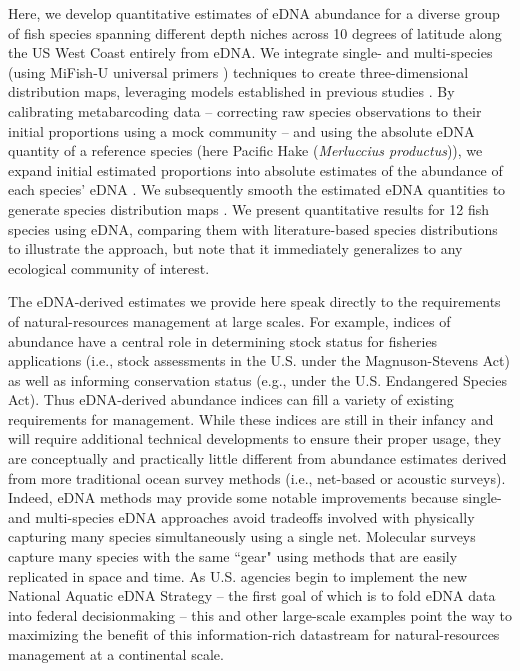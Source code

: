 \documentclass{article}
\begin{document}
Here, we develop quantitative estimates of eDNA abundance for a diverse group of fish species spanning different depth niches across 10 degrees of latitude along the US West Coast entirely from eDNA. We integrate single- and multi-species (using MiFish-U universal primers \cite{miya2015}) techniques to create three-dimensional distribution maps, leveraging models established in previous studies \cite{shelton2022, guri2024a, shelton2023, allan2023}. By calibrating metabarcoding data -- correcting raw species observations to their initial proportions using a mock community \cite{shelton2023} -- and using the absolute eDNA quantity of a reference species (here Pacific Hake (\textit{Merluccius productus})), we expand initial estimated proportions into absolute estimates of the abundance of each species’ eDNA \cite{guri2024a}. We subsequently smooth the estimated eDNA quantities to generate species distribution maps \cite{liu2023}. We present quantitative results for 12 fish species using eDNA, comparing them with literature-based species distributions to illustrate the approach, but note that it immediately generalizes to any ecological community of interest.

The eDNA-derived estimates we provide here speak directly to the requirements of natural-resources management at large scales. For example, indices of abundance have a central role in determining stock status for fisheries applications (i.e., stock assessments in the U.S. under the Magnuson-Stevens Act) as well as informing conservation status (e.g., under the U.S. Endangered Species Act). Thus eDNA-derived abundance indices can fill a variety of existing requirements for management. While these indices are still in their infancy and will require additional technical developments to ensure their proper usage, they are conceptually and practically little different from abundance estimates derived from more traditional ocean survey methods (i.e., net-based or acoustic surveys). Indeed, eDNA methods may provide some notable improvements because single- and multi-species eDNA approaches avoid tradeoffs involved with physically capturing many species simultaneously using a single net. Molecular surveys capture many species with the same ``gear" using methods that are easily replicated in space and time. As U.S. agencies begin to implement the new National Aquatic eDNA Strategy \cite{kelly2024} -- the first goal of which is to fold eDNA data into federal decisionmaking -- this and other large-scale examples point the way to maximizing the benefit of this information-rich datastream for natural-resources management at a continental scale.
\end{document}
